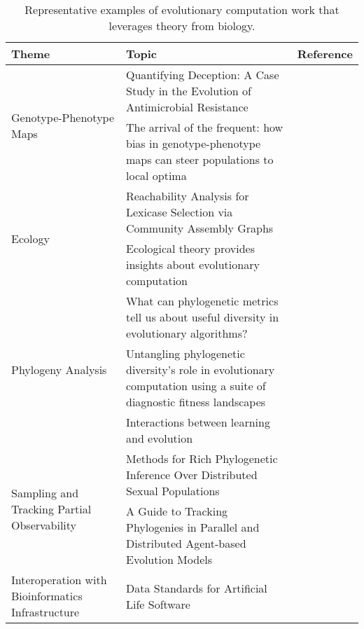 \begin{table*}
\centering
\caption{Representative examples of evolutionary computation work that leverages theory from biology.}
\label{tab:arbitrage-examples}
\begin{tabular}{@{}p{3.2cm}p{5.8cm}p{6cm}@{}}
\toprule
\textbf{Theme} & \textbf{Topic} & \textbf{Reference} \\
\midrule
\multirow{2}{*}{Genotype-Phenotype Maps} & Quantifying Deception: A Case Study in the Evolution of Antimicrobial Resistance & \citep{eppstein2016quantifying} \\
 & The arrival of the frequent: how bias in genotype-phenotype maps can steer populations to local optima & \citep{schaper2014arrival} \\
\midrule
\multirow{2}{*}{Ecology} & Reachability Analysis for Lexicase Selection via Community Assembly Graphs & \citep{dolson2024reachability} \\
 & Ecological theory provides insights about evolutionary computation & \citep{dolson2018ecological} \\
\midrule
\multirow{3}{*}{Phylogeny Analysis} & What can phylogenetic metrics tell us about useful diversity in evolutionary algorithms? & \citep{hernandez2022can} \\
 & Untangling phylogenetic diversity's role in evolutionary computation using a suite of diagnostic fitness landscapes & \citep{shahbandegan2022untangling} \\
 & Interactions between learning and evolution & \citep{ackley1991interactions} \\
\midrule
\multirow{2}{*}{Sampling and Tracking Partial Observability} & Methods for Rich Phylogenetic Inference Over Distributed Sexual Populations & \citep{moreno2024methods} \\
 & A Guide to Tracking Phylogenies in Parallel and Distributed Agent-based Evolution Models & \citep{moreno2024guide} \\
\midrule
Interoperation with Bioinformatics Infrastructure & Data Standards for Artificial Life Software & \citep{lalejini2019data} \\
\bottomrule
\end{tabular}
\end{table*}
